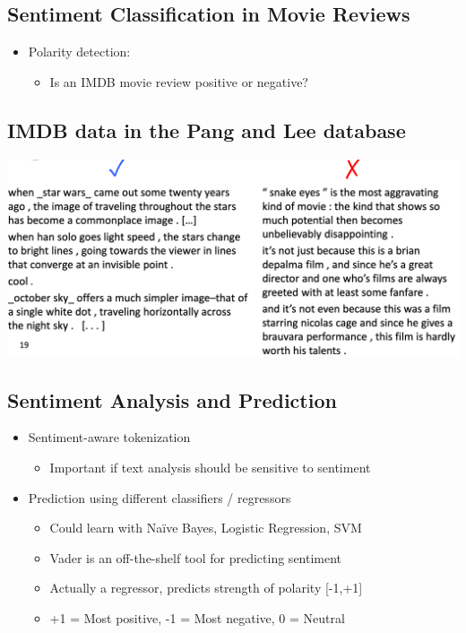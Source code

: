 \documentclass[11pt]{article}
\theoremstyle{definition}
\begin{document}
\subsection{Sentiment Classification in Movie Reviews}
\begin{itemize}
  \item Polarity detection:
  \begin{itemize}
    \item Is an IMDB movie review positive or negative?
  \end{itemize}
\end{itemize}

\subsection{IMDB data in the Pang and Lee database}
\includegraphics[width=\textwidth]{12.png}

\subsection{Sentiment Analysis and Prediction}
\begin{itemize}
  \item Sentiment-aware tokenization
  \begin{itemize}
    \item Important if text analysis should be sensitive to sentiment
  \end{itemize}
\end{itemize}
\begin{itemize}
  \item Prediction using different classifiers / regressors
  \begin{itemize}
    \item Could learn with Naïve Bayes, Logistic Regression, SVM
  \end{itemize}
  \begin{itemize}
    \item Vader is an off-the-shelf tool for predicting sentiment
    \item Actually a regressor, predicts strength of polarity [-1,+1]
    \item +1 = Most positive, -1 = Most negative, 0 = Neutral
  \end{itemize}
\end{itemize}
\end{document}
